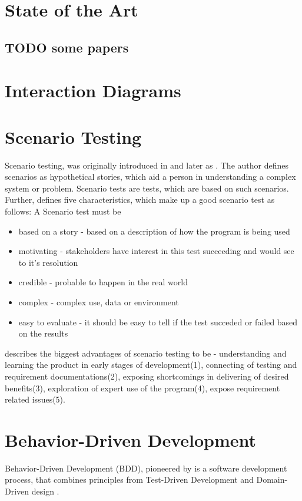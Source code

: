 \section{State of the Art}
\subsection{TODO some papers}


\section{Interaction Diagrams}
\section{Scenario Testing}
Scenario testing, was originally introduced in \textcite{kaner2003power} and later as \textcite{kaner2013introduction}. The author defines scenarios as hypothetical stories, which aid a person in understanding a complex system or problem. Scenario tests are tests, which are based on such scenarios.  \parencite[1]{kaner2013introduction}
Further, \parencite[2-5]{kaner2003power} defines five characteristics, which make up a good scenario test as follows:
A Scenario test must be
\begin{itemize}
    \item based on a story - based on a description of how the program is being used
    \item motivating - stakeholders have interest in this test succeeding and would see to it's resolution
    \item credible - probable to happen in the real world
    \item complex - complex use, data or environment
    \item easy to evaluate - it should be easy to tell if the test succeded or failed based on the results 
\end{itemize}
\textcite{kaner2013introduction} describes the biggest advantages of scenario testing to be  - understanding and learning the product in early stages of development(1), connecting of testing and requirement documentations(2), exposing shortcomings in delivering of desired benefits(3), exploration of expert use of the program(4), expose requirement related issues(5).

\section{Behavior-Driven Development}
Behavior-Driven Development (BDD), pioneered by  \textcite{north2006behavior} is a software development process, that combines principles from Test-Driven Development and Domain-Driven design \parencite{evans2004domain}. 

